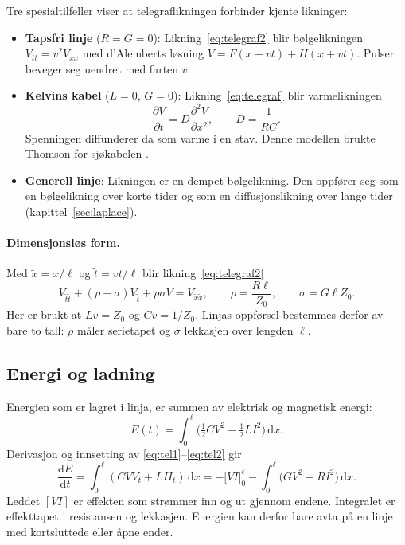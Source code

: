 \documentclass[11pt,a4paper]{article}
\numberwithin{equation}{section}
\numberwithin{figure}{section}
\numberwithin{table}{section}
\newcommand{\dd}{\mathrm{d}}
\newcommand{\pd}[2]{\frac{\partial #1}{\partial #2}}
\newcommand{\pdd}[2]{\frac{\partial^2 #1}{\partial #2^2}}
\begin{document}
Tre spesialtilfeller viser at telegraflikningen forbinder kjente likninger:
\begin{itemize}
  \item \textbf{Tapsfri linje} ($R = G = 0$): Likning~\eqref{eq:telegraf2} blir
        bølgelikningen $V_{tt} = v^2V_{xx}$ med d'Alemberts løsning
        $V = F(x - vt) + H(x + vt)$. Pulser beveger seg uendret med farten $v$.
  \item \textbf{Kelvins kabel} ($L = 0$, $G = 0$): Likning~\eqref{eq:telegraf}
        blir varmelikningen
        \begin{equation}
          \pd{V}{t} = D\pdd{V}{x}, \qquad D = \frac{1}{RC}. \label{eq:diffusjon}
        \end{equation}
        Spenningen diffunderer da som varme i en stav. Denne modellen brukte
        Thomson for sjøkabelen \cite{thomson1855}.
  \item \textbf{Generell linje}: Likningen er en dempet bølgelikning. Den oppfører
        seg som en bølgelikning over korte tider og som en diffusjonslikning over
        lange tider (kapittel~\ref{sec:laplace}).
\end{itemize}

\paragraph{Dimensjonsløs form.}
Med $\tilde x = x/\ell$ og $\tilde t = vt/\ell$ blir
likning~\eqref{eq:telegraf2}
\begin{equation}
  V_{\tilde t\tilde t} + (\rho + \sigma)V_{\tilde t} + \rho\sigma V = V_{\tilde x\tilde x},
  \qquad \rho = \frac{R\ell}{Z_0}, \qquad \sigma = G\ell Z_0. \label{eq:dimlos}
\end{equation}
Her er brukt at $Lv = Z_0$ og $Cv = 1/Z_0$. Linjas oppførsel bestemmes derfor av
bare to tall: $\rho$ måler serietapet og $\sigma$ lekkasjen over lengden $\ell$.

\subsection{Energi og ladning}\label{sec:energi}
Energien som er lagret i linja, er summen av elektrisk og magnetisk energi:
\begin{equation}
  E(t) = \int_0^\ell \Big(\tfrac12 CV^2 + \tfrac12 LI^2\Big)\,\dd x.
\end{equation}
Derivasjon og innsetting av \eqref{eq:tel1}--\eqref{eq:tel2} gir
\begin{equation}
  \frac{\dd E}{\dd t} = \int_0^\ell (CVV_t + LII_t)\,\dd x
  = -\Big[VI\Big]_0^\ell - \int_0^\ell \big(GV^2 + RI^2\big)\,\dd x. \label{eq:energi}
\end{equation}
Leddet $[VI]$ er effekten som strømmer inn og ut gjennom endene. Integralet er
effekttapet i resistansen og lekkasjen. Energien kan derfor bare avta på en linje
med kortsluttede eller åpne ender.
\end{document}
